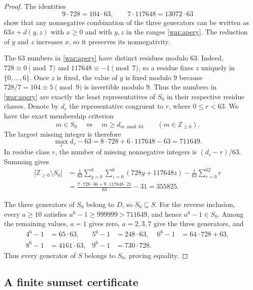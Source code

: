\documentclass[11pt,a4paper]{article}
\numberwithin{equation}{section}
\theoremstyle{remark}
\begin{document}
\begin{proof}
The identities
\[
 9\cdot728=104\cdot63,
 \qquad 7\cdot117648=13072\cdot63
\]
show that any nonnegative combination of the three generators can be written
as $63x+d(y,z)$ with $x\geq0$ and with $y,z$ in the ranges
\eqref{war:apery}. The reduction of $y$ and $z$ increases $x$, so it
preserves its nonnegativity.

The $63$ numbers in \eqref{war:apery} have distinct residues modulo $63$.
Indeed, $728\equiv0\pmod7$ and $117648\equiv-1\pmod7$, so a residue fixes
$z$ uniquely in $\{0,\ldots,6\}$. Once $z$ is fixed, the value of $y$ is
fixed modulo $9$ because $728/7=104\equiv5\pmod9$ is invertible modulo
$9$. Thus the numbers in \eqref{war:apery} are exactly the least
representatives of $S_0$ in their respective residue classes. Denote by $d_r$
the representative congruent to $r$, where $0\leq r<63$. We have the exact
membership criterion
\begin{equation}\label{war:membership}
 m\in S_0\quad\Longleftrightarrow\quad m\geq d_{m\bmod63}
 \qquad(m\in\mathbb Z_{\geq0}).
\end{equation}
The largest missing integer is therefore
\[
 \max_r d_r-63
 =8\cdot728+6\cdot117648-63=711649.
\]
In residue class $r$, the number of missing nonnegative integers is
$(d_r-r)/63$. Summing gives
\begin{align*}
 |\mathbb Z_{\geq0}\setminus S_0|
 &=\frac{1}{63}\sum_{y=0}^{8}\sum_{z=0}^{6}
       (728y+117648z)-\frac{1}{63}\sum_{r=0}^{62}r\\
 &=\frac{7\cdot728\cdot36+9\cdot117648\cdot21}{63}-31
 =355825.
\end{align*}

The three generators of $S_0$ belong to $D$, so $S_0\subseteq S$.
For the reverse inclusion, every $a\geq10$ satisfies
$a^6-1\geq999999>711649$, and hence $a^6-1\in S_0$. Among the remaining
values, $a=1$ gives zero, $a=2,3,7$ give the three generators, and
\begin{align*}
 4^6-1&=65\cdot63,&
 5^6-1&=248\cdot63,&
 6^6-1&=64\cdot728+63,\\
 8^6-1&=4161\cdot63,&
 9^6-1&=730\cdot728.
\end{align*}
Thus every generator of $S$ belongs to $S_0$, proving equality.
\end{proof}

\subsection{A finite sumset certificate}
\end{document}
